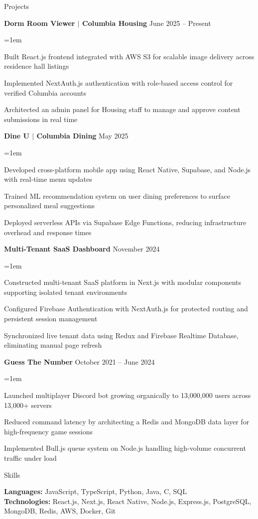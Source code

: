 \documentclass{resume}
\renewenvironment{rSubsection}[4]{
 {\bf #1} \hfill {#2}
 \ifthenelse{\equal{#3}{}}{}{
  \\
  {\em #3} \hfill {\em #4}
  }\vspace{-6pt}
  \begin{list}{\textbullet}{\leftmargin=1em \topsep=0pt \itemsep=2pt \parsep=0pt}
  }{
  \end{list}
  \vspace{0pt}
}
\begin{document}
\begin{rSection}{Projects}

\begin{rSubsection}{Dorm Room Viewer $|$ Columbia Housing}{June 2025 -- Present}{}{}
\item Built React.js frontend integrated with AWS S3 for scalable image delivery across residence hall listings
\item Implemented NextAuth.js authentication with role-based access control for verified Columbia accounts
\item Architected an admin panel for Housing staff to manage and approve content submissions in real time
\end{rSubsection}
\begin{rSubsection}{Dine U $|$ Columbia Dining}{May 2025}{}{}
\item Developed cross-platform mobile app using React Native, Supabase, and Node.js with real-time menu updates
\item Trained ML recommendation system on user dining preferences to surface personalized meal suggestions
\item Deployed serverless APIs via Supabase Edge Functions, reducing infrastructure overhead and response times
\end{rSubsection}
\begin{rSubsection}{Multi-Tenant SaaS Dashboard}{November 2024}{}{}
\item Constructed multi-tenant SaaS platform in Next.js with modular components supporting isolated tenant environments
\item Configured Firebase Authentication with NextAuth.js for protected routing and persistent session management
\item Synchronized live tenant data using Redux and Firebase Realtime Database, eliminating manual page refresh
\end{rSubsection}
\begin{rSubsection}{Guess The Number}{October 2021 -- June 2024}{}{}
\item Launched multiplayer Discord bot growing organically to 13,000,000 users across 13,000+ servers
\item Reduced command latency by architecting a Redis and MongoDB data layer for high-frequency game sessions
\item Implemented Bull.js queue system on Node.js handling high-volume concurrent traffic under load
\end{rSubsection}

\end{rSection}

\begin{rSection}{Skills}

\textbf{Languages:}\hspace{1pt} JavaScript, TypeScript, Python, Java, C, SQL \\
\textbf{Technologies:}\hspace{1pt} React.js, Next.js, React Native, Node.js, Express.js, PostgreSQL, MongoDB, Redis, AWS, Docker, Git

\end{rSection}
\end{document}
